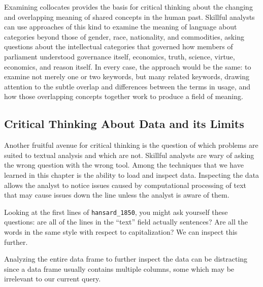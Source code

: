 \documentclass[
]{article}
\newcounter{chapter}
\begin{document}
Examining collocates provides the basis for critical thinking about the
changing and overlapping meaning of shared concepts in the human past.
Skillful analysts can use approaches of this kind to examine the meaning
of language about categories beyond those of gender, race, nationality,
and commodities, asking questions about the intellectual categories that
governed how members of parliament understood governance itself,
economics, truth, science, virtue, economics, and reason itself. In
every case, the approach would be the same: to examine not merely one or
two keywords, but many related keywords, drawing attention to the subtle
overlap and differences between the terms in usage, and how those
overlapping concepts together work to produce a field of meaning.

\subsection{Critical Thinking About Data and its
Limits}\label{critical-thinking-about-data-and-its-limits}

Another fruitful avenue for critical thinking is the question of which
problems are suited to textual analysis and which are not. Skillful
analysts are wary of asking the wrong question with the wrong tool.
Among the techniques that we have learned in this chapter is the ability
to load and inspect data. Inspecting the data allows the analyst to
notice issues caused by computational processing of text that may cause
issues down the line unless the analyst is aware of them.

Looking at the first lines of \texttt{hansard\_1850}, you might ask
yourself these questions: are all of the lines in the ``text'' field
actually sentences? Are all the words in the same style with respect to
capitalization? We can inspect this further.

Analyzing the entire data frame to further inspect the data can be
distracting since a data frame usually contains multiple columns, some
which may be irrelevant to our current query.
\end{document}
